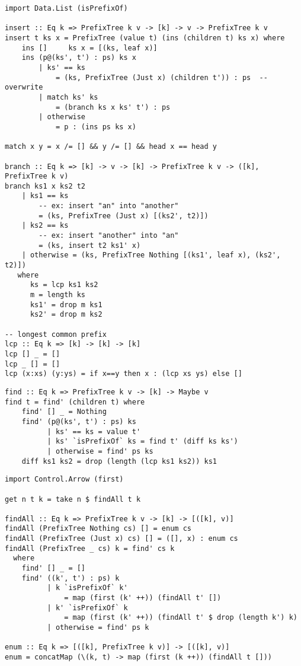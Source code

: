 \documentclass{ctexart}
\begin{document}
\lstset{language=Haskell}
\begin{lstlisting}[caption=前缀树的插入]
import Data.List (isPrefixOf)

insert :: Eq k => PrefixTree k v -> [k] -> v -> PrefixTree k v
insert t ks x = PrefixTree (value t) (ins (children t) ks x) where
    ins []     ks x = [(ks, leaf x)]
    ins (p@(ks', t') : ps) ks x
        | ks' == ks
            = (ks, PrefixTree (Just x) (children t')) : ps  -- overwrite
        | match ks' ks
            = (branch ks x ks' t') : ps
        | otherwise
            = p : (ins ps ks x)

match x y = x /= [] && y /= [] && head x == head y

branch :: Eq k => [k] -> v -> [k] -> PrefixTree k v -> ([k], PrefixTree k v)
branch ks1 x ks2 t2
    | ks1 == ks
        -- ex: insert "an" into "another"
        = (ks, PrefixTree (Just x) [(ks2', t2)])
    | ks2 == ks
        -- ex: insert "another" into "an"
        = (ks, insert t2 ks1' x)
    | otherwise = (ks, PrefixTree Nothing [(ks1', leaf x), (ks2', t2)])
   where
      ks = lcp ks1 ks2
      m = length ks
      ks1' = drop m ks1
      ks2' = drop m ks2

-- longest common prefix
lcp :: Eq k => [k] -> [k] -> [k]
lcp [] _ = []
lcp _ [] = []
lcp (x:xs) (y:ys) = if x==y then x : (lcp xs ys) else []
\end{lstlisting}

\lstset{language=Haskell}
\begin{lstlisting}[caption=字符前缀树的查找]
find :: Eq k => PrefixTree k v -> [k] -> Maybe v
find t = find' (children t) where
    find' [] _ = Nothing
    find' (p@(ks', t') : ps) ks
          | ks' == ks = value t'
          | ks' `isPrefixOf` ks = find t' (diff ks ks')
          | otherwise = find' ps ks
    diff ks1 ks2 = drop (length (lcp ks1 ks2)) ks1
\end{lstlisting}

\lstset{language=Haskell}
\begin{lstlisting}[caption=在前缀树中查找最多$n$个结果]
import Control.Arrow (first)

get n t k = take n $ findAll t k

findAll :: Eq k => PrefixTree k v -> [k] -> [([k], v)]
findAll (PrefixTree Nothing cs) [] = enum cs
findAll (PrefixTree (Just x) cs) [] = ([], x) : enum cs
findAll (PrefixTree _ cs) k = find' cs k
  where
    find' [] _ = []
    find' ((k', t') : ps) k
          | k `isPrefixOf` k'
              = map (first (k' ++)) (findAll t' [])
          | k' `isPrefixOf` k
              = map (first (k' ++)) (findAll t' $ drop (length k') k)
          | otherwise = find' ps k

enum :: Eq k => [([k], PrefixTree k v)] -> [([k], v)]
enum = concatMap (\(k, t) -> map (first (k ++)) (findAll t []))
\end{lstlisting}
\end{document}
